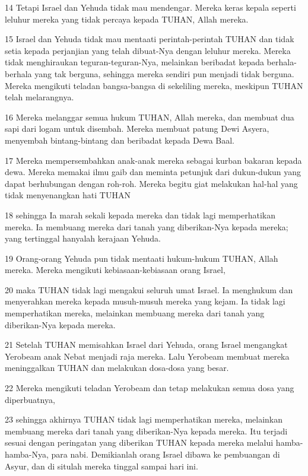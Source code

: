 \par 14 Tetapi Israel dan Yehuda tidak mau mendengar. Mereka keras kepala seperti leluhur mereka yang tidak percaya kepada TUHAN, Allah mereka.
\par 15 Israel dan Yehuda tidak mau mentaati perintah-perintah TUHAN dan tidak setia kepada perjanjian yang telah dibuat-Nya dengan leluhur mereka. Mereka tidak menghiraukan teguran-teguran-Nya, melainkan beribadat kepada berhala-berhala yang tak berguna, sehingga mereka sendiri pun menjadi tidak berguna. Mereka mengikuti teladan bangsa-bangsa di sekeliling mereka, meskipun TUHAN telah melarangnya.
\par 16 Mereka melanggar semua hukum TUHAN, Allah mereka, dan membuat dua sapi dari logam untuk disembah. Mereka membuat patung Dewi Asyera, menyembah bintang-bintang dan beribadat kepada Dewa Baal.
\par 17 Mereka mempersembahkan anak-anak mereka sebagai kurban bakaran kepada dewa. Mereka memakai ilmu gaib dan meminta petunjuk dari dukun-dukun yang dapat berhubungan dengan roh-roh. Mereka begitu giat melakukan hal-hal yang tidak menyenangkan hati TUHAN
\par 18 sehingga Ia marah sekali kepada mereka dan tidak lagi memperhatikan mereka. Ia membuang mereka dari tanah yang diberikan-Nya kepada mereka; yang tertinggal hanyalah kerajaan Yehuda.
\par 19 Orang-orang Yehuda pun tidak mentaati hukum-hukum TUHAN, Allah mereka. Mereka mengikuti kebiasaan-kebiasaan orang Israel,
\par 20 maka TUHAN tidak lagi mengakui seluruh umat Israel. Ia menghukum dan menyerahkan mereka kepada musuh-musuh mereka yang kejam. Ia tidak lagi memperhatikan mereka, melainkan membuang mereka dari tanah yang diberikan-Nya kepada mereka.
\par 21 Setelah TUHAN memisahkan Israel dari Yehuda, orang Israel mengangkat Yerobeam anak Nebat menjadi raja mereka. Lalu Yerobeam membuat mereka meninggalkan TUHAN dan melakukan dosa-dosa yang besar.
\par 22 Mereka mengikuti teladan Yerobeam dan tetap melakukan semua dosa yang diperbuatnya,
\par 23 sehingga akhirnya TUHAN tidak lagi memperhatikan mereka, melainkan membuang mereka dari tanah yang diberikan-Nya kepada mereka. Itu terjadi sesuai dengan peringatan yang diberikan TUHAN kepada mereka melalui hamba-hamba-Nya, para nabi. Demikianlah orang Israel dibawa ke pembuangan di Asyur, dan di situlah mereka tinggal sampai hari ini.
